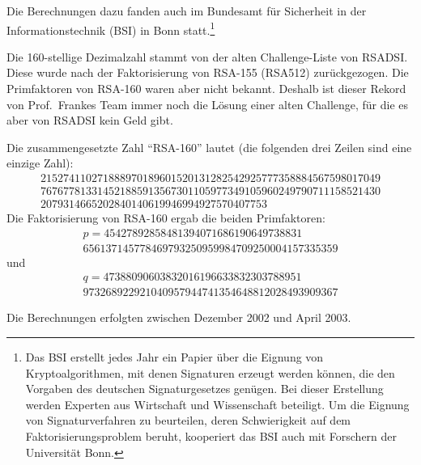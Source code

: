 \begin{refsegment}
Die Berechnungen dazu fanden auch im Bundesamt für Sicherheit in der
Informationstechnik (BSI) in Bonn statt.\footnote{%
Das BSI  erstellt jedes Jahr ein Papier über die Eignung von
Kryptoalgorithmen, mit denen Signaturen erzeugt werden können,
die den Vorgaben des deutschen Signaturgesetzes genügen.
Bei dieser Erstellung werden Experten aus Wirtschaft und Wissenschaft
beteiligt. Um die Eignung von Signaturverfahren zu beurteilen, deren
Schwierigkeit auf dem Faktorisierungsproblem beruht,
kooperiert das BSI auch mit Forschern der Universität Bonn.
}

Die 160-stellige Dezimalzahl stammt von der alten Challenge-Liste von RSADSI.
Diese wurde nach der Faktorisierung von RSA-155 (RSA512) zurückgezogen.
Die Primfaktoren von RSA-160 waren aber nicht bekannt.
Deshalb ist dieser Rekord von Prof.\ Frankes Team immer noch die Lösung
einer alten Challenge, für die es aber von RSADSI kein Geld gibt.

Die zusammengesetzte Zahl "`RSA-160"' lautet (die folgenden drei Zeilen
sind eine einzige Zahl):
$$
\begin{array}{c}
215274110271888970189601520131282542925777358884567598017049\\
767677813314521885913567301105977349105960249790711158521430\\
2079314665202840140619946994927570407753
\end{array}
$$
Die Faktorisierung von RSA-160 ergab die beiden Primfaktoren:
$$
\begin{array}{c}
p = 45427892858481394071686190649738831\\
    656137145778469793250959984709250004157335359
\end{array}
$$
und
$$
\begin{array}{c}
q = 47388090603832016196633832303788951\\
    973268922921040957944741354648812028493909367
\end{array}
$$

Die Berechnungen erfolgten zwischen Dezember 2002 und April 2003.
\vspace{24pt}




\end{refsegment}
